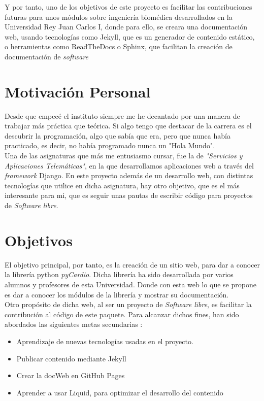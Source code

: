\documentclass[a4paper, 12pt]{book}
\begin{document}
Y por tanto, uno de los objetivos de este proyecto es facilitar las contribuciones futuras para unos módulos sobre ingeniería biomédica desarrollados en la Universidad Rey Juan Carlos I, donde para ello, se creara una documentación web, usando tecnologías como Jekyll, que es un generador de contenido estático, o herramientas como ReadTheDocs o Sphinx, que facilitan la creación de documentación de \emph{software} 


\section{Motivación Personal}
\label{sec:mot}
Desde que empecé el instituto siempre me he decantado por una manera de trabajar más práctica que teórica. Si algo tengo que destacar de la carrera es el descubrir la programación, algo que sabía que era, pero que nunca había practicado, es decir, no había programado nunca un "Hola Mundo". \\
Una de las asignaturas que más me entusiasmo cursar, fue la de \emph{"Servicios y Aplicaciones Telemáticas"}, en la que desarrollamos aplicaciones web a través del \emph{framework} Django. En este proyecto además de un desarrollo web, con distintas tecnologías que utilice en dicha asignatura, hay otro objetivo, que es el más interesante para mi, que es seguir unas pautas de escribir código para proyectos de \emph{Software libre}.
\newpage

\section{Objetivos}
\label{sec:objetivos}
El objetivo principal, por tanto, es la creación de un sitio web, para dar a conocer la librería python \emph{pyCardio}. Dicha librería ha sido desarrollada por varios alumnos y profesores de esta Universidad. Donde con esta web lo que se propone es dar a conocer los módulos de la librería y mostrar su documentación. \\
Otro propósito de dicha web, al ser un proyecto de \emph{Software libre}, es facilitar la contribución al código de este paquete. Para alcanzar dichos fines, han sido abordados las siguientes metas secundarias :
\begin{itemize}
    \item Aprendizaje de nuevas tecnologías usadas en el proyecto.
    \item Publicar contenido mediante Jekyll 
    \item Crear la docWeb en GitHub Pages
    \item Aprender a usar Liquid, para optimizar el desarrollo del contenido
\end{itemize}
\end{document}

